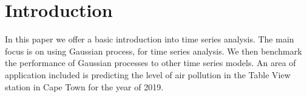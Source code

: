 \section{Introduction}
   
   In this paper we offer a basic introduction into time series analysis. The main focus is on using Gaussian process, for time series analysis. We then benchmark the performance of Gaussian processes to other time series models. An area of application included is predicting the level of air pollution in the Table View station in Cape Town for the year of 2019. 
   